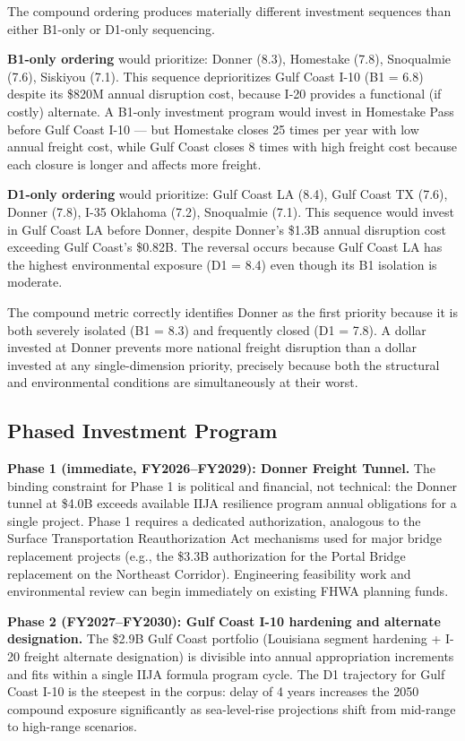The compound ordering produces materially different investment sequences than either B1-only or D1-only sequencing.

\textbf{B1-only ordering} would prioritize: Donner (8.3), Homestake (7.8), Snoqualmie (7.6), Siskiyou (7.1). This sequence deprioritizes Gulf Coast I-10 (B1 = 6.8) despite its \$820M annual disruption cost, because I-20 provides a functional (if costly) alternate. A B1-only investment program would invest in Homestake Pass before Gulf Coast I-10 --- but Homestake closes 25 times per year with low annual freight cost, while Gulf Coast closes 8 times with high freight cost because each closure is longer and affects more freight.

\textbf{D1-only ordering} would prioritize: Gulf Coast LA (8.4), Gulf Coast TX (7.6), Donner (7.8), I-35 Oklahoma (7.2), Snoqualmie (7.1). This sequence would invest in Gulf Coast LA before Donner, despite Donner's \$1.3B annual disruption cost exceeding Gulf Coast's \$0.82B. The reversal occurs because Gulf Coast LA has the highest environmental exposure (D1 = 8.4) even though its B1 isolation is moderate.

The compound metric correctly identifies Donner as the first priority because it is both severely isolated (B1 = 8.3) and frequently closed (D1 = 7.8). A dollar invested at Donner prevents more national freight disruption than a dollar invested at any single-dimension priority, precisely because both the structural and environmental conditions are simultaneously at their worst.

\subsection{Phased Investment Program}

\textbf{Phase 1 (immediate, FY2026--FY2029): Donner Freight Tunnel.}
The binding constraint for Phase 1 is political and financial, not technical: the Donner tunnel at \$4.0B exceeds available IIJA resilience program annual obligations for a single project. Phase 1 requires a dedicated authorization, analogous to the Surface Transportation Reauthorization Act mechanisms used for major bridge replacement projects (e.g., the \$3.3B authorization for the Portal Bridge replacement on the Northeast Corridor). Engineering feasibility work and environmental review can begin immediately on existing FHWA planning funds.

\textbf{Phase 2 (FY2027--FY2030): Gulf Coast I-10 hardening and alternate designation.}
The \$2.9B Gulf Coast portfolio (Louisiana segment hardening + I-20 freight alternate designation) is divisible into annual appropriation increments and fits within a single IIJA formula program cycle. The D1 trajectory for Gulf Coast I-10 is the steepest in the corpus: delay of 4 years increases the 2050 compound exposure significantly as sea-level-rise projections shift from mid-range to high-range scenarios.

